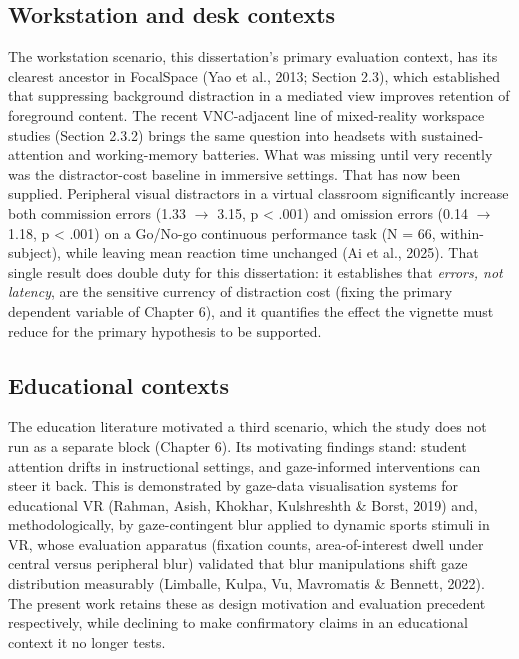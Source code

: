 \subsection{Workstation and desk contexts}

The workstation scenario, this dissertation's primary evaluation context, has its clearest
ancestor in FocalSpace (Yao et al., 2013; Section 2.3), which established that suppressing background
distraction in a mediated view improves retention of foreground content. The recent VNC-adjacent
line of mixed-reality workspace studies (Section 2.3.2) brings the same question into headsets with
sustained-attention and working-memory batteries. What was missing until very recently was the
distractor-cost baseline in immersive settings. That has now been supplied. Peripheral visual
distractors in a virtual classroom significantly increase both commission errors (1.33 $\rightarrow$ 3.15,
p < .001) and omission errors (0.14 $\rightarrow$ 1.18, p < .001) on a Go/No-go continuous performance task
(N = 66, within-subject), while leaving mean reaction time unchanged (Ai et al., 2025). That single result
does double duty for this dissertation: it establishes that \textit{errors, not latency}, are the sensitive
currency of distraction cost (fixing the primary dependent variable of Chapter 6), and it quantifies
the effect the vignette must reduce for the primary hypothesis to be supported.

\subsection{Educational contexts}

The education literature motivated a third scenario, which the study does not run as a separate
block (Chapter 6). Its motivating findings stand: student attention drifts in instructional settings, and
gaze-informed interventions can steer it back. This is demonstrated by gaze-data visualisation systems for
educational VR (Rahman, Asish, Khokhar, Kulshreshth \& Borst, 2019) and, methodologically, by
gaze-contingent blur applied to dynamic sports stimuli in VR, whose evaluation apparatus (fixation
counts, area-of-interest dwell under central versus peripheral blur) validated that blur
manipulations shift gaze distribution measurably (Limballe, Kulpa, Vu, Mavromatis \& Bennett, 2022).
The present work retains these as design motivation
and evaluation precedent respectively, while declining to make confirmatory claims in an educational
context it no longer tests.


